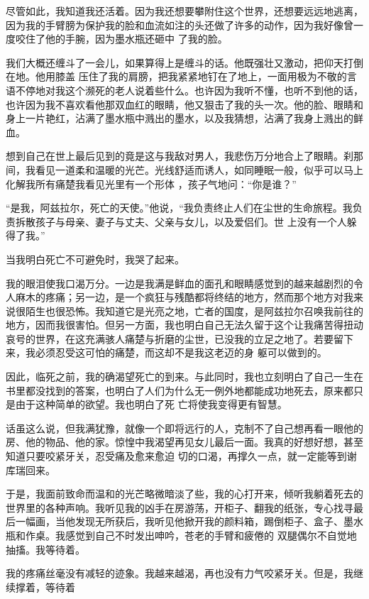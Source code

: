 \documentclass{article}
\begin{document}
尽管如此，我知道我还活着。因为我还想要攀附住这个世界，还想要远远地逃离，因为我的手臂膀为保护我的脸和血流如注的头还做了许多的动作，因为我好像曾一度咬住了他的手腕，因为墨水瓶还砸中
了我的脸。 

我们大概还缠斗了一会儿，如果算得上是缠斗的话。他既强壮又激动，把仰天打倒在地。他用膝盖
\newpage
压住了我的肩膀，把我紧紧地钉在了地上，一面用极为不敬的言语不停地对我这个濒死的老人说着些什么。也许因为我听不懂，也听不到他的话，也许因为我不喜欢看他那双血红的眼睛，他又狠击了我的头一次。他的脸、眼睛和身上一片艳红，沾满了墨水瓶中溅出的墨水，以及我猜想，沾满了我身上溅出的鲜血。
 

想到自己在世上最后见到的竟是这与我敌对男人，我悲伤万分地合上了眼睛。刹那间，我看见一道柔和温暖的光芒。光线舒适而诱人，如同睡眠一般，似乎可以马上化解我所有痛楚我看见光里有一个形体
，孩子气地问：“你是谁？” 

“是我，阿兹拉尔，死亡的天使。”他说，“我负责终止人们在尘世的生命旅程。我负责拆散孩子与母亲、妻子与丈夫、父亲与女儿，以及爱侣们。世
上没有一个人躲得了我。” 


当我明白死亡不可避免时，我哭了起来。 

\newpage

我的眼泪使我口渴万分。一边是我满是鲜血的面孔和眼睛感觉到的越来越剧烈的令人麻木的疼痛；另一边，是一个疯狂与残酷都将终结的地方，然而那个地方对我来说很陌生也很恐怖。我知道它是光亮之地，亡者的国度，是阿兹拉尔召唤我前往的地方，因而我很害怕。但另一方面，我也明白自己无法久留于这个让我痛苦得扭动哀号的世界，在这充满骇人痛楚与折磨的尘世，已没我的立足之地了。若要留下来，我必须忍受这可怕的痛楚，而这却不是我这老迈的身
躯可以做到的。 

因此，临死之前，我的确渴望死亡的到来。与此同时，我也立刻明白了自己一生在书里都没找到的答案，也明白了人们为什么无一例外地都能成功地死去，原来都只是由于这种简单的欲望。我也明白了死
亡将使我变得更有智慧。 

话虽这么说，但我满犹豫，就像一个即将远行的人，克制不了自己想再看一眼他的房、他的物品、他的家。惊惶中我渴望再见女儿最后一面。我真的好想好想，甚至知道只要咬紧牙关，忍受痛及愈来愈迫
\newpage
切的口渴，再撑久一点，就一定能等到谢库瑞回来。

于是，我面前致命而温和的光芒略微暗淡了些，我的心打开来，倾听我躺着死去的世界里的各种声响。我听见我的凶手在房游荡，开柜子、翻我的纸张，专心找寻最后一幅画，当他发现无所获后，我听见他掀开我的颜料箱，踢倒柜子、盒子、墨水瓶和作桌。我感觉到自己不时发出呻吟，苍老的手臂和疲倦的
双腿偶尔不自觉地抽搐。我等待着。 

我的疼痛丝毫没有减轻的迹象。我越来越渴，再也没有力气咬紧牙关。但是，我继续撑着，等待着
\end{document}
